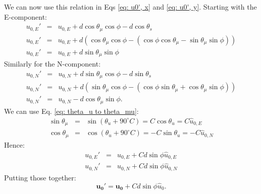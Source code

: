 \documentclass[twocolumn]{aastex701}
\newcommand{\vect}[1]{\boldsymbol{#1}}
\begin{document}
We can now use this relation in Eqs \ref{eq: u0', x} and \ref{eq: u0', y}. Starting with the E-component:
\begin{eqnarray}
\label{eq: u0x'}
    u_{0, E}' &=& u_{0, E} + d\cos\theta_{\mu}\cos\phi - d\cos\theta_s \\
    u_{0, E}' &=& u_{0, E} + d(\cos\theta_{\mu}\cos\phi - (\cos\phi\cos\theta_{\mu} - \sin\theta_{\mu}\sin\phi))\\
\label{eq: u0x' simplified}
    u_{0, E}' &=& u_{0, E} + d\sin\theta_{\mu}\sin\phi
\end{eqnarray}
Similarly for the N-component:
\begin{eqnarray}
\label{eq: u0y'}
    u_{0, N}' &=& u_{0, N} + d\sin\theta_{\mu}\cos\phi - d\sin\theta_s \\
    u_{0, N}' &=& u_{0, N} + d(\sin\theta_{\mu}\cos\phi - (\cos\phi\sin\theta_{\mu} + \cos\theta_{\mu}\sin\phi)) \\
    \label{eq: u0y' simplified}
    u_{0, N}' &=& u_{0, N}  - d\cos\theta_{\mu}\sin\phi.
\end{eqnarray}
We can use Eq. \ref{eq: theta_u to theta_mu}:
\begin{eqnarray}
\label{sin theta_mu conversion}
    \sin\theta_{\mu} &=& \sin(\theta_u + 90^{\circ}C) = C\cos\theta_u = C\hat{u}_{0,E} \\
\label{cos theta_mu conversion}
    \cos\theta_{\mu} &=& \cos(\theta_u + 90^{\circ}C) = -C\sin\theta_u = -C\hat{u}_{0,N}
\end{eqnarray}
Hence:
\begin{eqnarray}
    u_{0, E}' &=& u_{0, E} +Cd\sin\phi\hat{u}_{0,E} \\
    u_{0, N}' &=& u_{0, N} +Cd\sin\phi\hat{u}_{0,N}
\end{eqnarray}
Putting those together:
\begin{equation}
\label{eq: u0 transform general}
    \boxed{\vect{u_0}' = \vect{u_0} + Cd\sin\phi\hat{u}_0}.
\end{equation}
\end{document}
